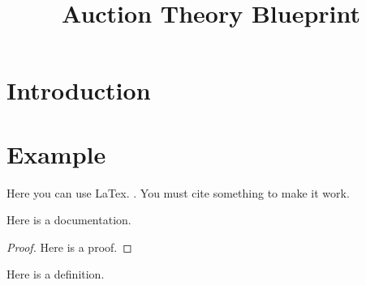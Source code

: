 \title{Auction Theory Blueprint} 




\maketitle


\tableofcontents
\section{Introduction}



\section{Example}
Here you can use LaTex. \cite{marcus}. You must cite something to make it work.

\begin{lemma}\label{two_different_elements}
    \leanok
    Here is a documentation.
\end{lemma}

\begin{proof}
    Here is a proof.
\end{proof}

\begin{definition}\label{Auction}
    \leanok
    Here is a definition.
\end{definition}








